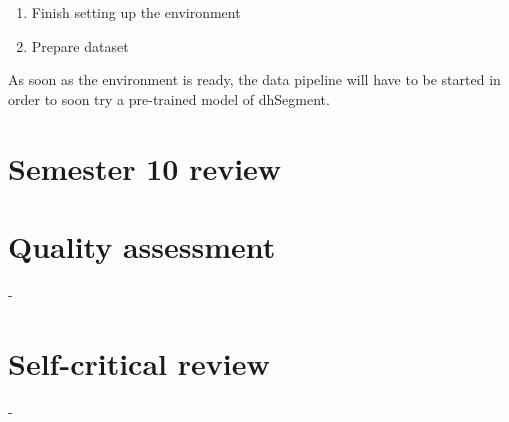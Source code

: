 \documentclass{polytech/polytech}
\numberwithin{figure}{chapter}
\begin{document}
\begin{enumerate}
\item Finish setting up the environment
\item Prepare dataset
\end{enumerate}

As soon as the environment is ready, the data pipeline will have to be started in order to soon try a pre-trained model of dhSegment.

\section{Semester 10 review}


\section{Quality assessment}

-

\section{Self-critical review}

-
\end{document}
